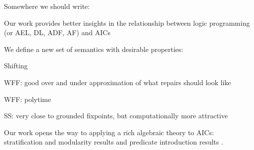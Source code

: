 Somewhere we should write:
\begin{compactitem}
 \item Our work provides better insights in the relationship between logic programming (or AEL, DL, ADF, AF) and AICs
\item We define a new set of semantics with desirable properties:
\begin{compactitem}
\item  Shifting
 \item WFF: good over and under approximation of what repairs should look like
 \item WFF: polytime
 \item SS: very close to grounded fixpoints, but computationally more attractive
\end{compactitem}\item Our work opens the way to applying a rich algebraic theory to AICs: stratification and modularity results \cite{tocl/VennekensGD06,tocl/BogaertsVD16} and predicate introduction results \cite{VennekensMWD07a,VennekensMWD07b}. 
\end{compactitem}
 